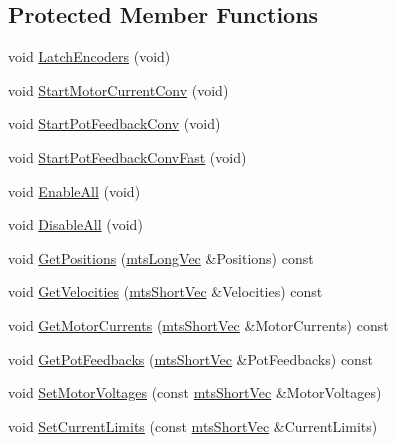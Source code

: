 \subsection*{Protected Member Functions}
\begin{DoxyCompactItemize}
\item 
void \hyperlink{classmts_lo_po_mo_co_aef21dadb70636f34c3674f5f1bc3bd53}{Latch\+Encoders} (void)
\item 
void \hyperlink{classmts_lo_po_mo_co_a46a1f51a4123956838720c4dca50aeeb}{Start\+Motor\+Current\+Conv} (void)
\item 
void \hyperlink{classmts_lo_po_mo_co_a3181fa8f81a530e20de55adbcb09a50e}{Start\+Pot\+Feedback\+Conv} (void)
\item 
void \hyperlink{classmts_lo_po_mo_co_a18238e257128dff22573950fbcabbe85}{Start\+Pot\+Feedback\+Conv\+Fast} (void)
\item 
void \hyperlink{classmts_lo_po_mo_co_a45c547240bba97cd4358dfe5c0484542}{Enable\+All} (void)
\item 
void \hyperlink{classmts_lo_po_mo_co_a540842d14cc67089cd0dab1579b5b242}{Disable\+All} (void)
\item 
void \hyperlink{classmts_lo_po_mo_co_aa2037e3920acbb529e2e3a163d52d792}{Get\+Positions} (\hyperlink{mts_vector_8h_a3e011934ab1b5774f640a7bb70d9a672}{mts\+Long\+Vec} \&Positions) const 
\item 
void \hyperlink{classmts_lo_po_mo_co_aa6289b399da0bf7f536e90a811600263}{Get\+Velocities} (\hyperlink{mts_vector_8h_a70974166b1900882680f3002b69e11c5}{mts\+Short\+Vec} \&Velocities) const 
\item 
void \hyperlink{classmts_lo_po_mo_co_a7ba6e1e29a54575d4511c487ace79077}{Get\+Motor\+Currents} (\hyperlink{mts_vector_8h_a70974166b1900882680f3002b69e11c5}{mts\+Short\+Vec} \&Motor\+Currents) const 
\item 
void \hyperlink{classmts_lo_po_mo_co_ac5cc00b1a930711fce5cf1cd274f922d}{Get\+Pot\+Feedbacks} (\hyperlink{mts_vector_8h_a70974166b1900882680f3002b69e11c5}{mts\+Short\+Vec} \&Pot\+Feedbacks) const 
\item 
void \hyperlink{classmts_lo_po_mo_co_a039fdbe3af9ab8e06d3bd6e2156f441a}{Set\+Motor\+Voltages} (const \hyperlink{mts_vector_8h_a70974166b1900882680f3002b69e11c5}{mts\+Short\+Vec} \&Motor\+Voltages)
\item 
void \hyperlink{classmts_lo_po_mo_co_afff8ede1c86fb740cf8bf123363263bc}{Set\+Current\+Limits} (const \hyperlink{mts_vector_8h_a70974166b1900882680f3002b69e11c5}{mts\+Short\+Vec} \&Current\+Limits)

\end{DoxyCompactItemize}
